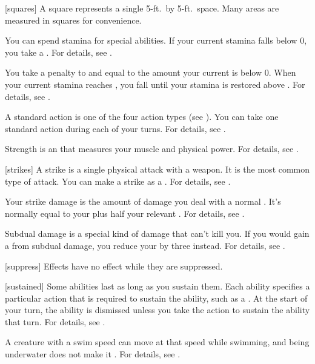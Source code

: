 [squares] A square represents a single 5-ft.\ by 5-ft.\ space.
Many areas are measured in squares for convenience.

 You can spend stamina for special abilities.
If your current stamina falls below 0, you take a .
For details, see .

 You take a penalty to  and  equal to the amount your current  is below 0.
When your current stamina reaches , you fall \unconscious until your stamina is restored above .
For details, see .

 A standard action is one of the four action types (see ).
You can take one standard action during each of your turns.
For details, see .

 Strength is an  that measures your muscle and physical power.
For details, see .

[strikes] A strike is a single physical attack with a weapon.
It is the most common type of attack.
You can make a strike as a .
For details, see .

 Your strike damage is the amount of damage you deal with a normal .
It's normally equal to your  plus half your relevant .
For details, see .

 Subdual damage is a special kind of damage that can't kill you.
If you would gain a  from subdual damage, you reduce your  by three instead.
For details, see .

[suppress] Effects have no effect while they are suppressed.

[sustained] Some abilities last as long as you sustain them.
Each ability specifies a particular action that is required to sustain the ability, such as a .
At the start of your turn, the ability is dismissed unless you take the action to sustain the ability that turn.
For details, see .

 A creature with a swim speed can move at that speed while swimming, and being underwater does not make it \unsteady.
For details, see .

